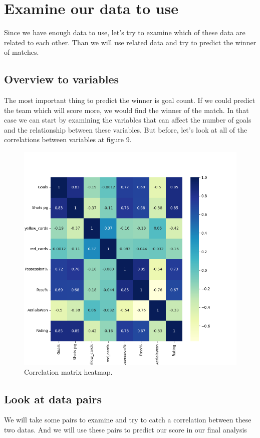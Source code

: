 \documentclass[conference]{IEEEtran}
\begin{document}
\section{Examine our data to use}
Since we have enough data to use, let's try to examine which of these data are related to each other. Than we will use related data
and try to predict the winner of matches.
\subsection{Overview to variables}
The most important thing to predict the winner is goal count. If we could predict the team which will score more, we would find the winner of the match. In that case we can start by examining the variables that can affect the number of goals and the relationship between these variables. But before, let's look at all of the correlations between variables at figure 9.
\begin{figure}[h]
  \includegraphics[width=\linewidth]{HeatMap.png}
  \caption{Correlation matrix heatmap.}
  \label{fig:heat}
\end{figure}


\subsection{Look at data pairs}
We will take some pairs to examine and try to catch a correlation between these two datas. And we will use these pairs to predict our score in our final analysis
 
\end{document}
